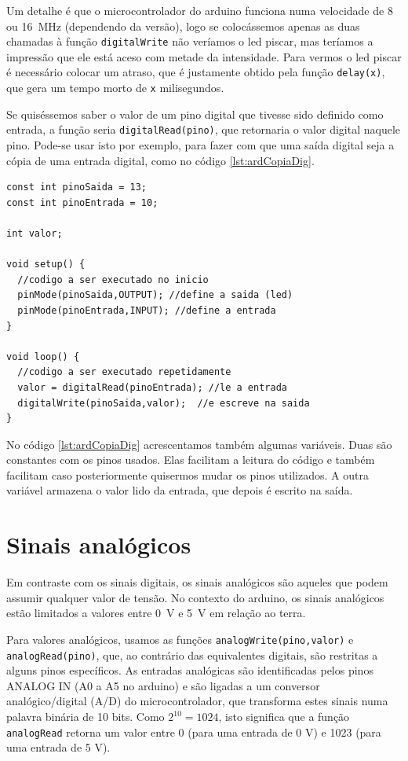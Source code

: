 Um detalhe é que o microcontrolador do arduino funciona numa velocidade de 8 ou \SI{16}{MHz} (dependendo da versão), logo se colocássemos apenas as duas chamadas à função \lstinline|digitalWrite| não veríamos o led piscar, mas teríamos a impressão que ele está aceso com metade da intensidade. Para vermos o led piscar é necessário colocar um atraso, que é justamente obtido pela função \lstinline|delay(x)|, que gera um tempo morto de \lstinline|x| milisegundos.

Se quiséssemos saber o valor de um pino digital que tivesse sido definido como entrada, a função seria \lstinline|digitalRead(pino)|, que retornaria o valor digital naquele pino. Pode-se usar isto por exemplo, para fazer com que uma saída digital seja a cópia de uma entrada digital, como no código \ref{lst:ardCopiaDig}.
\begin{lstlisting}[caption= Programa para acender um led em função de uma entrada digital.,label=lst:ardCopiaDig]
const int pinoSaida = 13;
const int pinoEntrada = 10;

int valor;

void setup() {
  //codigo a ser executado no inicio
  pinMode(pinoSaida,OUTPUT); //define a saida (led)
  pinMode(pinoEntrada,INPUT); //define a entrada
}

void loop() {
  //codigo a ser executado repetidamente
  valor = digitalRead(pinoEntrada); //le a entrada
  digitalWrite(pinoSaida,valor);  //e escreve na saida
}	
\end{lstlisting}

No código \ref{lst:ardCopiaDig} acrescentamos também algumas variáveis. Duas são constantes com os pinos usados. Elas facilitam a leitura do código e também facilitam caso posteriormente quisermos mudar os pinos utilizados. A outra variável armazena o valor lido da entrada, que depois é escrito na saída. 

\section{Sinais analógicos}
Em contraste com os sinais digitais, os sinais analógicos são aqueles que podem assumir qualquer valor de tensão. No contexto do arduino, os sinais analógicos estão limitados a valores entre \SI{0}{V} e \SI{5}{V} em relação ao terra.

Para valores analógicos, usamos as funções \lstinline|analogWrite(pino,valor)| e \lstinline|analogRead(pino)|, que, ao contrário das equivalentes digitais, são restritas a alguns pinos específicos. As entradas analógicas são identificadas pelos pinos ANALOG IN (A0 a A5 no arduino) e são ligadas a um conversor analógico/digital (A/D) do microcontrolador, que transforma estes sinais numa palavra binária de 10 bits. Como $2^{10} = 1024$, isto significa que a função \lstinline|analogRead| retorna um valor entre 0 (para uma entrada de 0 V) e 1023 (para uma entrada de 5 V).

